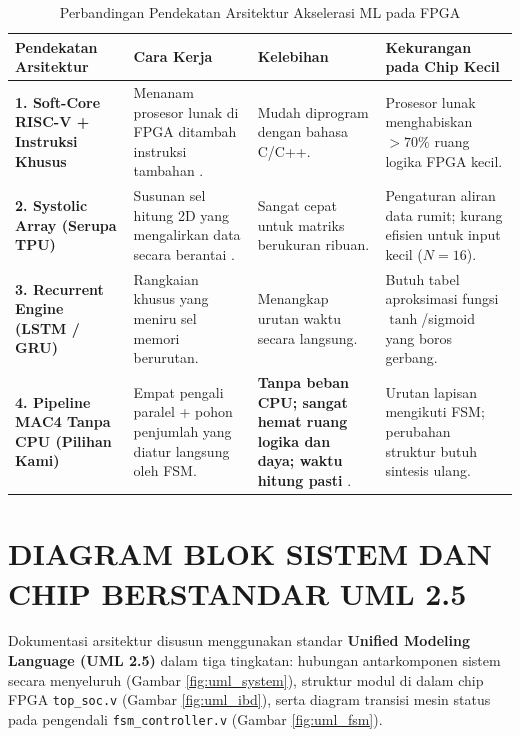 \documentclass[12pt,a4paper]{article}
\begin{document}
\begin{table}[h!]
\centering
\small
{}
\caption{Perbandingan Pendekatan Arsitektur Akselerasi ML pada FPGA}
\label{tab:komparasi_metode}
\begin{tabularx}{\textwidth}{p{3.2cm}Xp{3.5cm}p{3.1cm}}
\toprule
\textbf{Pendekatan Arsitektur} & \textbf{Cara Kerja} & \textbf{Kelebihan} & \textbf{Kekurangan pada Chip Kecil} \\
\midrule
\textbf{1. Soft-Core RISC-V + Instruksi Khusus} & Menanam prosesor lunak di FPGA ditambah instruksi tambahan \cite{prakash2023}. & Mudah diprogram dengan bahasa C/C++. & Prosesor lunak menghabiskan $>70\%$ ruang logika FPGA kecil. \\
\midrule
\textbf{2. Systolic Array (Serupa TPU)} & Susunan sel hitung 2D yang mengalirkan data secara berantai \cite{jouppi2017}. & Sangat cepat untuk matriks berukuran ribuan. & Pengaturan aliran data rumit; kurang efisien untuk input kecil ($N=16$). \\
\midrule
\textbf{3. Recurrent Engine (LSTM / GRU)} & Rangkaian khusus yang meniru sel memori berurutan. & Menangkap urutan waktu secara langsung. & Butuh tabel aproksimasi fungsi $\tanh$/sigmoid yang boros gerbang. \\
\midrule
\textbf{4. Pipeline MAC4 Tanpa CPU (Pilihan Kami)} & Empat pengali paralel + pohon penjumlah yang diatur langsung oleh FSM. & \textbf{Tanpa beban CPU; sangat hemat ruang logika dan daya; waktu hitung pasti} \cite{borras2022}. & Urutan lapisan mengikuti FSM; perubahan struktur butuh sintesis ulang. \\
\bottomrule
\end{tabularx}
\end{table}

\section{DIAGRAM BLOK SISTEM DAN CHIP BERSTANDAR UML 2.5}

Dokumentasi arsitektur disusun menggunakan standar \textbf{Unified Modeling Language (UML 2.5)} \cite{omg_uml25} dalam tiga tingkatan: hubungan antarkomponen sistem secara menyeluruh (Gambar \ref{fig:uml_system}), struktur modul di dalam chip FPGA \texttt{top\_soc.v} (Gambar \ref{fig:uml_ibd}), serta diagram transisi mesin status pada pengendali \texttt{fsm\_controller.v} (Gambar \ref{fig:uml_fsm}).
\end{document}
